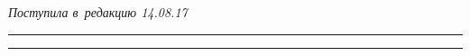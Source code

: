 \vspace*{-6pt}





\hfill{\small\textit{Поступила в~редакцию 14.08.17}}














\vspace*{4pt}





\hrule





\vspace*{2pt}















\hrule
















\def\tit{ABOUT COMPLEX AUTHENTICATION}





\def\titkol{About complex authentication}








\def\aut{A.\,A.~Grusho$^1$, M.\,I.~Zabezhailo$^1$, D.\,V.~Smirnov$^2$, 


and~E.\,E.~Timonina$^1$}


\def\autkol{A.\,A.~Grusho, M.\,I.~Zabezhailo, D.\,V.~Smirnov, 


and~E.\,E.~Timonina}











